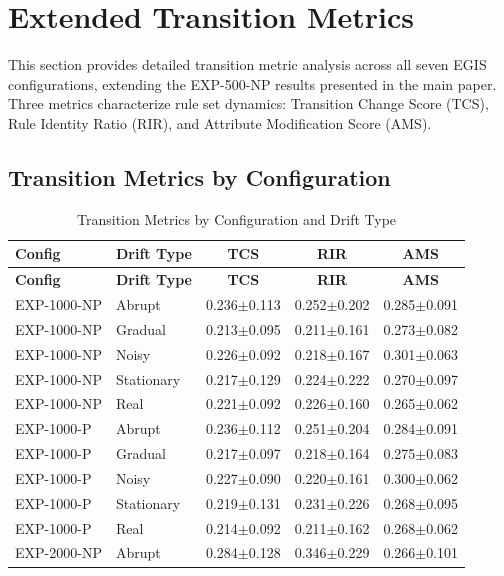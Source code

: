 \documentclass[lettersize,10pt]{article}
\begin{document}
\section{Extended Transition Metrics}
\label{sec:s4}
This section provides detailed transition metric analysis across all seven EGIS configurations, extending the EXP-500-NP results presented in the main paper. Three metrics characterize rule set dynamics: Transition Change Score (TCS), Rule Identity Ratio (RIR), and Attribute Modification Score (AMS).

\subsection{Transition Metrics by Configuration}
\label{sec:s4_by_config}

\begin{longtable}{llccc}
\caption{Transition Metrics by Configuration and Drift Type}\label{tab:s_transitions_all} \\
\toprule
\textbf{Config} & \textbf{Drift Type} & \textbf{TCS} & \textbf{RIR} & \textbf{AMS} \\
\midrule
\endfirsthead
\toprule
\textbf{Config} & \textbf{Drift Type} & \textbf{TCS} & \textbf{RIR} & \textbf{AMS} \\
\midrule
\endhead
EXP-1000-NP & Abrupt & 0.236$\pm$0.113 & 0.252$\pm$0.202 & 0.285$\pm$0.091 \\
EXP-1000-NP & Gradual & 0.213$\pm$0.095 & 0.211$\pm$0.161 & 0.273$\pm$0.082 \\
EXP-1000-NP & Noisy & 0.226$\pm$0.092 & 0.218$\pm$0.167 & 0.301$\pm$0.063 \\
EXP-1000-NP & Stationary & 0.217$\pm$0.129 & 0.224$\pm$0.222 & 0.270$\pm$0.097 \\
EXP-1000-NP & Real & 0.221$\pm$0.092 & 0.226$\pm$0.160 & 0.265$\pm$0.062 \\
\midrule
EXP-1000-P & Abrupt & 0.236$\pm$0.112 & 0.251$\pm$0.204 & 0.284$\pm$0.091 \\
EXP-1000-P & Gradual & 0.217$\pm$0.097 & 0.218$\pm$0.164 & 0.275$\pm$0.083 \\
EXP-1000-P & Noisy & 0.227$\pm$0.090 & 0.220$\pm$0.161 & 0.300$\pm$0.062 \\
EXP-1000-P & Stationary & 0.219$\pm$0.131 & 0.231$\pm$0.226 & 0.268$\pm$0.095 \\
EXP-1000-P & Real & 0.214$\pm$0.092 & 0.211$\pm$0.162 & 0.268$\pm$0.062 \\
\midrule
EXP-2000-NP & Abrupt & 0.284$\pm$0.128 & 0.346$\pm$0.229 & 0.266$\pm$0.101 \\

\end{longtable}
\end{document}
